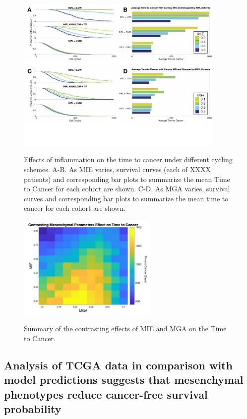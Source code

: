 \documentclass[11pt]{article}
\begin{document}
\begin{figure}
\center
{\includegraphics[width=0.9\textwidth]{Figure4/Figure4.pdf}}
\caption{Effects of inflammation on the time to cancer under different cycling schemes. A-B. As MIE varies, survival curves (each of XXXX patients)  and corresponding bar plots to summarize the mean Time to Cancer for each cohort are shown. C-D. As MGA varies, survival curves  and corresponding bar plots to summarize the mean time to cancer for each cohort are shown.}
\label{fig:VaryINFL_and_MesPars}
\end{figure}


\begin{figure}
\center
{\includegraphics[width=0.6\textwidth]{Figure5/MIEvsMGA_bigcbar.jpg}}
\caption{Summary of the contrasting effects of MIE and MGA on the Time to Cancer.
}
\label{fig:MIEvsMGA}
\end{figure}

\subsection{Analysis of TCGA data in comparison with model predictions suggests that mesenchymal phenotypes reduce cancer-free survival probability}\label{tcga}
\end{document}
